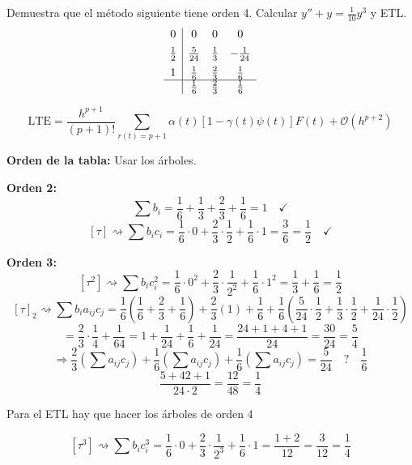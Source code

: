 \begin{ejer}
[5.7.2] Demuestra que el m\'etodo siguiente tiene orden 4. Calcular $y'' + y = \frac{1}{10} y^3$ y ETL. 
\[
\begin{array}{c|ccc}
0           & 0             & 0             & 0             \\[0.5em]
\frac{1}{2} & \frac{5}{24}  & \frac{1}{3}   & -\frac{1}{24} \\[0.5em]
1           & \frac{1}{6}   & \frac{2}{3}   & \frac{1}{6}   \\
\hline
            & \frac{1}{6}   & \frac{2}{3}   & \frac{1}{6}
\end{array}
\]

\end{ejer}\begin{sol}
    
$$ \text{LTE} = \frac{h^{p+1}}{(p+1)!} \sum_{r(t)=p+1} \alpha(t) \left[1 - \gamma(t)\psi(t)\right] F(t) + \mathcal{O}(h^{p+2}) $$

\textbf{Orden de la tabla:} Usar los árboles.

\textbf{Orden 2:}
$$ \sum b_i = \frac{1}{6} + \frac{1}{3} + \frac{2}{3} + \frac{1}{6} = 1 \quad \checkmark $$
$$ [\tau] \rightsquigarrow \sum b_i c_i = \frac{1}{6}\cdot 0 + \frac{2}{3}\cdot \frac{1}{2} + \frac{1}{6}\cdot 1 = \frac{3}{6} = \frac{1}{2} \quad \checkmark $$

\textbf{Orden 3:}
$$ [\tau^2] \rightsquigarrow \sum b_i c_i^2 = \frac{1}{6}\cdot 0^2 + \frac{2}{3}\cdot \frac{1}{2^2} + \frac{1}{6}\cdot 1^2 = \frac{1}{3} + \frac{1}{6} = \frac{1}{2} $$
$$ [\tau]_2 \rightsquigarrow \sum b_i a_{ij} c_j = \frac{1}{6}\left(\frac{1}{6} + \frac{2}{3} + \frac{1}{6}\right) + \frac{2}{3}(1) + \frac{1}{6} + \frac{1}{6}\left(\frac{5}{24}\cdot \frac{1}{2} + \frac{1}{3}\cdot \frac{1}{2} + \frac{1}{24}\cdot \frac{1}{2}\right) $$
$$ = \frac{2}{3}\cdot \frac{1}{4} + \frac{1}{64} = 1 + \frac{1}{24} + \frac{1}{6} + \frac{1}{24} = \frac{24+1+4+1}{24} = \frac{30}{24} = \frac{5}{4} $$
$$ \Rightarrow \frac{2}{3}\left(\sum a_{ij} c_j\right) + \frac{1}{6}\left(\sum a_{ij} c_j\right) + \frac{1}{6}\left(\sum a_{ij} c_j\right) = \frac{5}{24} \quad \text{?} \quad \frac{1}{6} $$
$$ \frac{5+42+1}{24\cdot 2} = \frac{12}{48} = \frac{1}{4} $$

Para el ETL hay que hacer los árboles de orden 4

$$ [\tau^3] \rightsquigarrow \sum b_i c_i^3 = \frac{1}{6}\cdot 0 + \frac{2}{3}\cdot \frac{1}{2^3} + \frac{1}{6}\cdot 1 = \frac{1+2}{12} = \frac{3}{12} = \frac{1}{4} $$


\end{sol}
